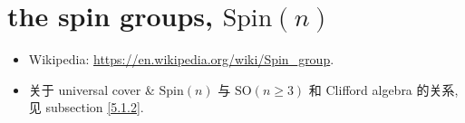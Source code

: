 \chapter{the spin groups, \texorpdfstring{$\mathrm{Spin}(n)$}{Spin(n)}}
\begin{itemize}
	\item Wikipedia: \url{https://en.wikipedia.org/wiki/Spin_group}.
	
	\item 关于 universal cover \& $\mathrm{Spin}(n)$ 与 $\mathrm{SO}(n \geq 3)$ 和 Clifford algebra 的关系, 见 subsection \ref{5.1.2}.
\end{itemize}
